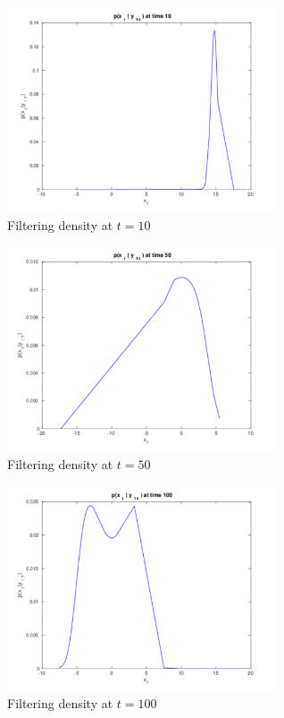 \documentclass[11pt]{article}
\begin{document}
\begin{figure}[h]
  
  \centering
    \includegraphics[width=80mm]{../figs/005_13_t10.pdf}
    \caption{Filtering density at $t=10$}
    \label{t10}
\end{figure}

\begin{figure}[h]
  
  \centering
    \includegraphics[width=80mm]{../figs/006_13_t50.pdf}
    \caption{Filtering density at $t=50$}
    \label{t50}
\end{figure}

\begin{figure}[h]
  
  \centering
    \includegraphics[width=80mm]{../figs/007_13_t100.pdf}
    \caption{Filtering density at $t=100$}
    \label{t100}
\end{figure}
\end{document}
